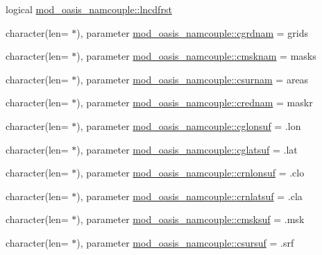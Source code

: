 \begin{DoxyCompactItemize}
\item 
logical \hyperlink{namespacemod__oasis__namcouple_a645168dae20a0c24786c3e6dcea9f2ab}{mod\+\_\+oasis\+\_\+namcouple\+::lncdfrst}
\item 
character(len= $\ast$), parameter \hyperlink{namespacemod__oasis__namcouple_a6550ad2692a6520d9d32776d63e6ed55}{mod\+\_\+oasis\+\_\+namcouple\+::cgrdnam} = \textquotesingle{}grids\textquotesingle{}
\item 
character(len= $\ast$), parameter \hyperlink{namespacemod__oasis__namcouple_a29b8cbc6b088d00d249b654bd27b9a1f}{mod\+\_\+oasis\+\_\+namcouple\+::cmsknam} = \textquotesingle{}masks\textquotesingle{}
\item 
character(len= $\ast$), parameter \hyperlink{namespacemod__oasis__namcouple_aeda2e47deb9277960f4c93a6a13b0154}{mod\+\_\+oasis\+\_\+namcouple\+::csurnam} = \textquotesingle{}areas\textquotesingle{}
\item 
character(len= $\ast$), parameter \hyperlink{namespacemod__oasis__namcouple_ab4734950f9668a5963529abde7f140e1}{mod\+\_\+oasis\+\_\+namcouple\+::crednam} = \textquotesingle{}maskr\textquotesingle{}
\item 
character(len= $\ast$), parameter \hyperlink{namespacemod__oasis__namcouple_a567386ecec7dd84b0118f58d83be4dc7}{mod\+\_\+oasis\+\_\+namcouple\+::cglonsuf} = \textquotesingle{}.lon\textquotesingle{}
\item 
character(len= $\ast$), parameter \hyperlink{namespacemod__oasis__namcouple_abe6c8d1cffb890fb291b1365bd331c54}{mod\+\_\+oasis\+\_\+namcouple\+::cglatsuf} = \textquotesingle{}.lat\textquotesingle{}
\item 
character(len= $\ast$), parameter \hyperlink{namespacemod__oasis__namcouple_ad4cb94d4f381883a5e238f76d35a1d7d}{mod\+\_\+oasis\+\_\+namcouple\+::crnlonsuf} = \textquotesingle{}.clo\textquotesingle{}
\item 
character(len= $\ast$), parameter \hyperlink{namespacemod__oasis__namcouple_a01ddb33a9647852321bb5b3fed99f74d}{mod\+\_\+oasis\+\_\+namcouple\+::crnlatsuf} = \textquotesingle{}.cla\textquotesingle{}
\item 
character(len= $\ast$), parameter \hyperlink{namespacemod__oasis__namcouple_aea73257d04086fa6a1ddff0baa72cb34}{mod\+\_\+oasis\+\_\+namcouple\+::cmsksuf} = \textquotesingle{}.msk\textquotesingle{}
\item 
character(len= $\ast$), parameter \hyperlink{namespacemod__oasis__namcouple_ad0ee67817c139b0c78721a9adf102cb3}{mod\+\_\+oasis\+\_\+namcouple\+::csursuf} = \textquotesingle{}.srf\textquotesingle{}

\end{DoxyCompactItemize}
